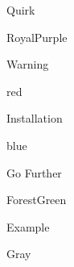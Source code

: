 \usepackage{tcolorbox}

\newcommand{\defprop}[3]{
  \expandafter\def\csname @val@#1@#2\endcsname{#3}
}

\newcommand{\getprop}[2]{%
  \ifcsname @val@#1@#2\endcsname%
  \csname @val@#1@#2\endcsname%
  \fi
}

\newcommand{\defbox}[3]{
  \defprop{#1}{title}{#2}
  \defprop{#1}{color}{#3}
}

\defbox{quirk}{Quirk}{RoyalPurple}
\defbox{warning}{Warning}{red}
\defbox{installation}{Installation}{blue}
\defbox{further}{Go Further}{ForestGreen}
\defbox{example}{Example}{Gray}

\newenvironment{bookblock}[1]{
  \ifcsname @val@#1@color\endcsname
  \begin{tcolorbox}[colback=\getprop{#1}{color}!5!white,
                    colframe=\getprop{#1}{color}!75!white,
                    title={\getprop{#1}{title}}]
  \else
  \PackageError{bookblock}{Unknown book block '#1'}{}
  \fi
}{
\end{tcolorbox}
}

